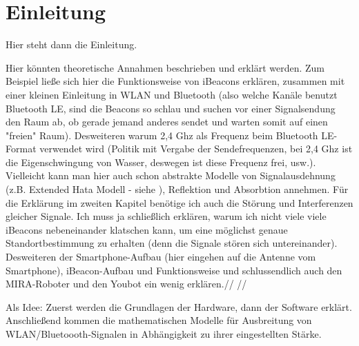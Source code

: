 \chapter{Einleitung}
Hier steht dann die Einleitung.

Hier könnten theoretische Annahmen beschrieben und erklärt werden. Zum Beispiel ließe sich hier die Funktionsweise von iBeacons erklären, zusammen mit einer kleinen Einleitung in WLAN und Bluetooth (also welche Kanäle benutzt Bluetooth LE, sind die Beacons so schlau und suchen vor einer Signalsendung den Raum ab, ob gerade jemand anderes sendet und warten somit auf einen "freien" Raum). Desweiteren warum 2,4 Ghz als Frequenz beim Bluetooth LE-Format verwendet wird (Politik mit Vergabe der Sendefrequenzen, bei 2,4 Ghz ist die Eigenschwingung von Wasser, deswegen ist diese Frequenz frei, usw.). Vielleicht kann man hier auch schon abstrakte Modelle von Signalausdehnung (z.B. Extended Hata Modell - siehe ), Reflektion und Absorbtion annehmen. Für die Erklärung im zweiten Kapitel benötige ich auch die Störung und Interferenzen gleicher Signale. Ich muss ja schließlich erklären, warum ich nicht viele viele iBeacons nebeneinander klatschen kann, um eine möglichst genaue Standortbestimmung zu erhalten (denn die Signale stören sich untereinander).  Desweiteren der Smartphone-Aufbau (hier eingehen auf die Antenne vom Smartphone), iBeacon-Aufbau und Funktionsweise und schlussendlich auch den MIRA-Roboter und den Youbot ein wenig erklären.// //

Als Idee: Zuerst werden die Grundlagen der Hardware, dann der Software erklärt. Anschließend kommen die mathematischen Modelle für Ausbreitung von WLAN/Bluetoooth-Signalen in Abhängigkeit zu ihrer eingestellten Stärke. 